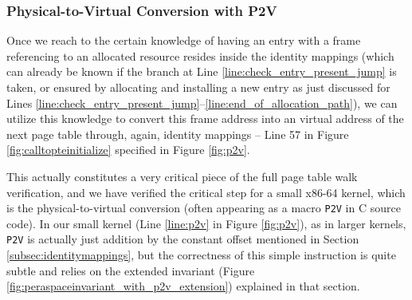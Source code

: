 \subsubsection{Physical-to-Virtual Conversion with \textsf{P2V}}
\label{sec:p2v}
Once we reach to the certain knowledge of having an entry with a frame referencing to an allocated resource resides inside the identity mappings
(which can already be known if the branch at Line \ref{line:check_entry_present_jump} is taken, or ensured by allocating and installing a new entry
as just discussed for Lines \ref{line:check_entry_present_jump}--\ref{line:end_of_allocation_path}), 
we can utilize this knowledge 
to convert this frame address into an virtual address of the next page table through, again, identity mappings -- Line 57 in Figure \ref{fig:calltopteinitialize} 
specified in Figure \ref{fig:p2v}.

This actually constitutes a very critical piece of the full page table walk verification, and we have verified the critical step for a small x86-64 kernel, 
which is the physical-to-virtual conversion (often appearing as a macro \texttt{P2V} in C source code). 
In our small kernel (Line \ref{line:p2v} in Figure \ref{fig:p2v}), as in larger kernels, \texttt{P2V} is actually just addition by the
constant offset mentioned in Section \ref{subsec:identitymappings}, but the correctness 
of this simple instruction is quite subtle and relies on the extended invariant (Figure \ref{fig:peraspaceinvariant_with_p2v_extension})
explained in that section.

